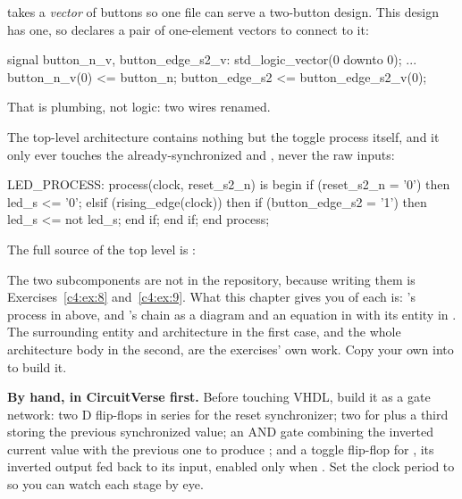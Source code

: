  takes a \emph{vector} of buttons so one file can serve a two-button design. This
design has one, so  declares a pair of one-element vectors to connect to
it:

\begin{vhdlcode}
signal button_n_v, button_edge_s2_v: std_logic_vector(0 downto 0);
...
button_n_v(0)  <= button_n;
button_edge_s2 <= button_edge_s2_v(0);
\end{vhdlcode}

\noindent That is plumbing, not logic: two wires renamed.

The top-level architecture contains nothing but the toggle process itself, and it only ever touches
the already-synchronized  and , never the raw inputs:

\begin{vhdlcode}
LED_PROCESS: process(clock, reset_s2_n) is
begin
    if (reset_s2_n = '0') then
        led_s <= '0';
    elsif (rising_edge(clock)) then
        if (button_edge_s2 = '1') then
            led_s <= not led_s;
        end if;
    end if;
end process;
\end{vhdlcode}

\noindent The full source of the top level is :


\noindent The two subcomponents are not in the repository, because writing them is
Exercises~\ref{c4:ex:8} and~\ref{c4:ex:9}. What this chapter gives you of each is:
's process in  above, and 's chain as a diagram and
an equation in  with its entity in . The surrounding entity and
architecture in the first case, and the whole architecture body in the second, are the exercises'
own work. Copy your own into  to build it.

\textbf{By hand, in CircuitVerse first.} Before touching VHDL, build it as a gate network: two D
flip-flops in series for the reset synchronizer; two for  plus a third storing the
previous synchronized value; an AND gate combining the inverted current value with the previous one
to produce ; and a toggle flip-flop for , its inverted output fed
back to its input, enabled only when . Set the clock period to
\mbox{} so you can watch each stage by eye.

